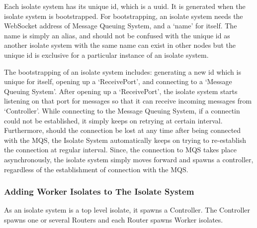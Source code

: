   Each isolate system has its unique id, which is a \acrshort{uuid}. It is generated when the isolate system is bootstrapped. For bootstrapping, an isolate system needs the WebSocket address of Message Queuing System, and a ‘name’ for itself. The name is simply an alias, and should not be confused with the unique id as another isolate system with the same name can exist in other nodes but the unique id is exclusive for a particular instance of an isolate system.

  The bootstrapping of an isolate system includes: generating a new id which is unique for itself, opening up a ‘ReceivePort’, and connecting to a ‘Message Queuing System’. After opening up a ‘ReceivePort’, the isolate system starts listening on that port for messages so that it can receive incoming messages from ‘Controller’. While connecting to the Message Queuing System, if a connectin could not be established, it simply keeps on retrying at certain interval. Furthermore, should the connection be lost at any time after being connected with the MQS, the Isolate System automatically keeps on trying to re-establish the connection at regular interval. Since, the connection to MQS takes place asynchronously, the isolate system simply moves forward and spawns a controller, regardless of the establishment of connection with the MQS.

  \subsubsection{Adding Worker Isolates to The Isolate System}
  As an isolate system is a top level isolate, it spawns a Controller. The Controller spawns one or several Routers and each Router spawns Worker isolates.


